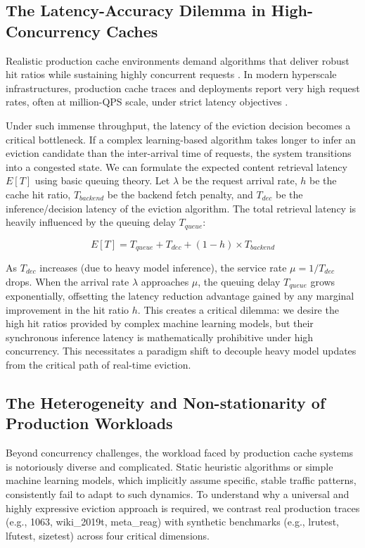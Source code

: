 \documentclass[10pt,journal]{IEEEtran}
\theoremstyle{slantedlemma}
\begin{document}
\subsection{The Latency-Accuracy Dilemma in High-Concurrency Caches}

Realistic production cache environments demand algorithms that deliver robust hit ratios while sustaining highly concurrent requests \cite{songHALP2023,yangs3FIFO2023}. In modern hyperscale infrastructures, production cache traces and deployments report very high request rates, often at million-QPS scale, under strict latency objectives \cite{yangLargeScaleTwitter2021}.

Under such immense throughput, the latency of the eviction decision becomes a critical bottleneck. If a complex learning-based algorithm takes longer to infer an eviction candidate than the inter-arrival time of requests, the system transitions into a congested state. We can formulate the expected content retrieval latency $E[T]$ using basic queuing theory. Let $\lambda$ be the request arrival rate, $h$ be the cache hit ratio, $T_{backend}$ be the backend fetch penalty, and $T_{dec}$ be the inference/decision latency of the eviction algorithm. The total retrieval latency is heavily influenced by the queuing delay $T_{queue}$:

\begin{equation}
E[T] = T_{queue} + T_{dec} + (1 - h) \times T_{backend}
\label{eq:latency}
\end{equation}

As $T_{dec}$ increases (due to heavy model inference), the service rate $\mu = 1 / T_{dec}$ drops. When the arrival rate $\lambda$ approaches $\mu$, the queuing delay $T_{queue}$ grows exponentially, offsetting the latency reduction advantage gained by any marginal improvement in the hit ratio $h$. This creates a critical dilemma: we desire the high hit ratios provided by complex machine learning models, but their synchronous inference latency is mathematically prohibitive under high concurrency. This necessitates a paradigm shift to decouple heavy model updates from the critical path of real-time eviction.

\subsection{The Heterogeneity and Non-stationarity of Production Workloads}

Beyond concurrency challenges, the workload faced by production cache systems is notoriously diverse and complicated. Static heuristic algorithms or simple machine learning models, which implicitly assume specific, stable traffic patterns, consistently fail to adapt to such dynamics. To understand why a universal and highly expressive eviction approach is required, we contrast real production traces (e.g., 1063, wiki\_2019t, meta\_reag) with synthetic benchmarks (e.g., lrutest, lfutest, sizetest) across four critical dimensions.
\end{document}
